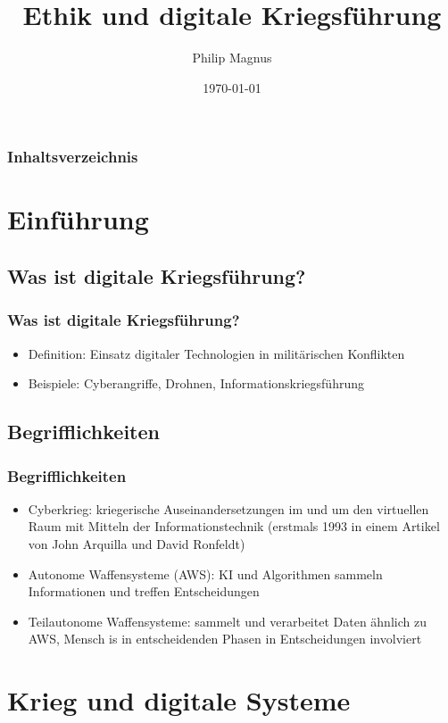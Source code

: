\documentclass[12pt]{beamer}
\title{Ethik und digitale Kriegsführung}
\author{Philip Magnus}
\institute{FH Campus Wien}
\date{\today}
\begin{document}
\begin{frame}
    \titlepage
\end{frame}
\begin{frame}
    \frametitle{Inhaltsverzeichnis}
    \tableofcontents
\end{frame}

\section{Einführung}
\subsection{Was ist digitale Kriegsführung?}

\begin{frame}
    \frametitle{Was ist digitale Kriegsführung?}
    \begin{itemize}
        \item Definition: Einsatz digitaler Technologien in militärischen Konflikten
        \item Beispiele: Cyberangriffe, Drohnen, Informationskriegsführung 
    \end{itemize}
\end{frame}

\subsection{Begrifflichkeiten}

\begin{frame}
    \frametitle{Begrifflichkeiten}
    \begin{itemize}
        \item Cyberkrieg: kriegerische Auseinandersetzungen im und um den virtuellen Raum mit Mitteln der Informationstechnik (erstmals 1993 in einem Artikel von John Arquilla und David Ronfeldt) \cite{cyberkrieg}
        \item Autonome Waffensysteme (AWS): KI und Algorithmen sammeln Informationen und treffen Entscheidungen \cite{amnesty}
        \item Teilautonome Waffensysteme: sammelt und verarbeitet Daten ähnlich zu AWS, Mensch is in entscheidenden Phasen in Entscheidungen involviert
    \end{itemize}
\end{frame}

\section{Krieg und digitale Systeme}
\end{document}
